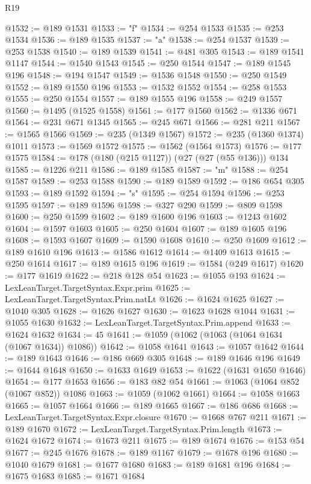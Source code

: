 \begin{lexlean}{R19}
\begin{coremodule}
@1532 := @189 @1531
@1533 := "f"
@1534 := @254 @1533
@1535 := @253 @1534
@1536 := @189 @1535
@1537 := "a"
@1538 := @254 @1537
@1539 := @253 @1538
@1540 := @189 @1539
@1541 := @481 @305
@1543 := @189 @1541 @1147
@1544 := @1540 @1543
@1545 := @250 @1544
@1547 := @189 @1545 @196
@1548 := @194 @1547
@1549 := @1536 @1548
@1550 := @250 @1549
@1552 := @189 @1550 @196
@1553 := @1532 @1552
@1554 := @258 @1553
@1555 := @250 @1554
@1557 := @189 @1555 @196
@1558 := @249 @1557
@1560 := @1495 (@1525 @1558)
@1561 := @177 @1560
@1562 := @1336 @671
@1564 := @231 @671 @1345
@1565 := @245 @671
@1566 := @281 @211
@1567 := @1565 @1566
@1569 := @235 (@1349 @1567)
@1572 := @235 (@1360 @1374) @1011
@1573 := @1569 @1572
@1575 := @1562 (@1564 @1573)
@1576 := @177 @1575
@1584 := @178 (@180 (@215 @1127)) (@27 (@27 (@55 @136))) @134
@1585 := @1226 @211
@1586 := @189 @1585
@1587 := "m"
@1588 := @254 @1587
@1589 := @253 @1588
@1590 := @189 @1589
@1592 := @186 @654 @305
@1593 := @189 @1592
@1594 := "s"
@1595 := @254 @1594
@1596 := @253 @1595
@1597 := @189 @1596
@1598 := @327 @290
@1599 := @809 @1598
@1600 := @250 @1599
@1602 := @189 @1600 @196
@1603 := @1243 @1602
@1604 := @1597 @1603
@1605 := @250 @1604
@1607 := @189 @1605 @196
@1608 := @1593 @1607
@1609 := @1590 @1608
@1610 := @250 @1609
@1612 := @189 @1610 @196
@1613 := @1586 @1612
@1614 := @1409 @1613
@1615 := @250 @1614
@1617 := @189 @1615 @196
@1619 := @1584 (@249 @1617)
@1620 := @177 @1619
@1622 := @218 @128 @54
@1623 := @1055 @193
@1624 := LexLeanTarget.TargetSyntax.Expr.prim
@1625 := LexLeanTarget.TargetSyntax.Prim.natLt
@1626 := @1624 @1625
@1627 := @1040 @305
@1628 := @1626 @1627
@1630 := @1623 @1628 @1044
@1631 := @1055 @1630
@1632 := LexLeanTarget.TargetSyntax.Prim.append
@1633 := @1624 @1632
@1634 := 45
@1641 := @1059 (@1062 (@1063 (@1064 @1634 (@1067 @1634)) @1086))
@1642 := @1058 @1641
@1643 := @1057 @1642
@1644 := @189 @1643
@1646 := @186 @669 @305
@1648 := @189 @1646 @196
@1649 := @1644 @1648
@1650 := @1633 @1649
@1653 := @1622 (@1631 @1650 @1646)
@1654 := @177 @1653
@1656 := @183 @82 @54
@1661 := @1063 (@1064 @852 (@1067 @852)) @1086
@1663 := @1059 (@1062 @1661)
@1664 := @1058 @1663
@1665 := @1057 @1664
@1666 := @189 @1665
@1667 := @186 @686
@1668 := LexLeanTarget.TargetSyntax.Expr.closure
@1670 := @1668 @767 @211
@1671 := @189 @1670
@1672 := LexLeanTarget.TargetSyntax.Prim.length
@1673 := @1624 @1672
@1674 := @1673 @211
@1675 := @189 @1674
@1676 := @153 @54
@1677 := @245 @1676
@1678 := @189 @1167
@1679 := @1678 @196
@1680 := @1040 @1679
@1681 := @1677 @1680
@1683 := @189 @1681 @196
@1684 := @1675 @1683
@1685 := @1671 @1684

\end{coremodule}
\end{lexlean}
